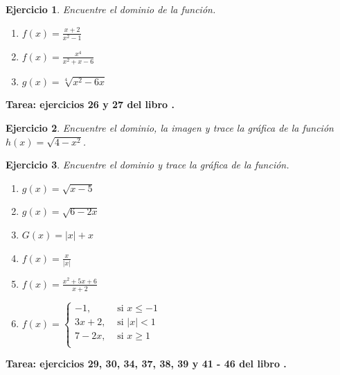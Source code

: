 \documentclass[12pt,tikz,border=5pt]{article}
\newtheorem{ejercicio}{Ejercicio}[section]
\begin{document}
\begin{ejercicio}
  Encuentre el dominio de la función.
  \begin{enumerate}[label=(\alph*)]
    \item $f(x) = \displaystyle\frac{x+2}{x^{2} - 1}$
    \item $f(x) = \displaystyle\frac{x^4}{x^2+x-6}$
    \item $g(x) = \sqrt[4]{x^2 - 6x}$
  \end{enumerate}
\end{ejercicio}

\textbf{Tarea: ejercicios 26 y 27 del libro \citep{stewart2001calculo}.}

\begin{ejercicio}
  Encuentre el dominio, la imagen y trace la gráfica de la función $h(x) = \sqrt{4 - x^2}$.
\end{ejercicio}

\begin{ejercicio}
  Encuentre el dominio y trace la gráfica de la función.
  \begin{enumerate}[label=(\alph*)]
    \item $g(x) = \sqrt{x - 5}$
    \item $g(x) = \sqrt{6 - 2x}$
    \item $G(x) = |x| + x$
    \item $f(x) = \displaystyle\frac{x}{|x|}$
    \item $f(x) = \displaystyle\frac{x^2 + 5x + 6}{x + 2}$
    \item $f(x) = 
      \begin{cases}
        -1, &\text{ si } x \leq -1\\
        3x + 2, &\text{ si } |x| < 1\\
        7 - 2x, &\text{ si } x \geq 1\\
      \end{cases}$
  \end{enumerate}
\end{ejercicio}

\textbf{Tarea: ejercicios 29, 30, 34, 37, 38, 39 y 41 - 46 del libro \citep{stewart2001calculo}.}
\end{document}
